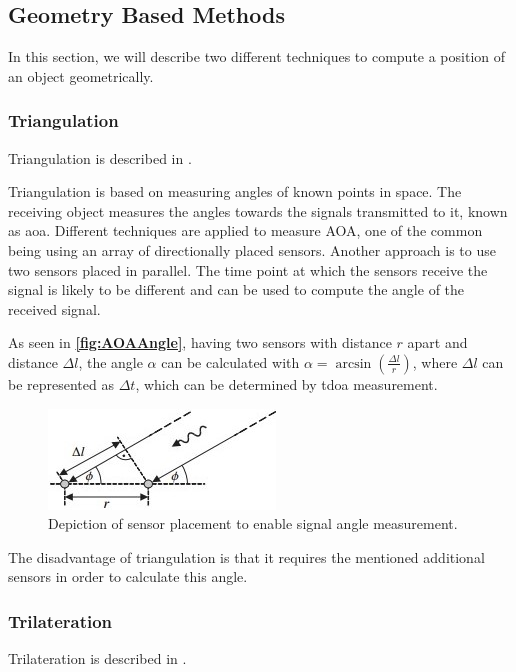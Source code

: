 \subsection{Geometry Based Methods} 
In this section, we will describe two different techniques to compute a position of an object geometrically.

\subsubsection{Triangulation} \label{sec:triangulation}
Triangulation is described in \cite{Triangulation}.

Triangulation is based on measuring angles of known points in space. The receiving object measures the angles towards the signals transmitted to it, known as \gls{aoa}. Different techniques are applied to measure AOA, one of the common being using an array of directionally placed sensors. Another approach is to use two sensors placed in parallel. The time point at which the sensors receive the signal is likely to be different and can be used to compute the angle of the received signal.

As seen in \textbf{\autoref{fig:AOAAngle}}, having two sensors with distance $r$ apart and distance $\Delta l$, the angle $\alpha$ can be calculated with $\alpha = \arcsin (\frac{\Delta l}{r})$, where $\Delta l$ can be represented as $\Delta t$, which can be determined by \gls{tdoa} measurement.

\begin{figure}[H]
    \centering
    \includegraphics[scale=1.0]{Images/ProblemAnalysis/AOA_fig.jpg}
    \caption{Depiction of sensor placement to enable signal angle measurement\cite{Triangulation}.}
    \label{fig:AOAAngle}
\end{figure}

The disadvantage of triangulation is that it requires the mentioned additional sensors in order to calculate this angle.

\subsubsection{Trilateration} \label{sec:trilateration}
Trilateration is described in \cite{Triangulation}.

